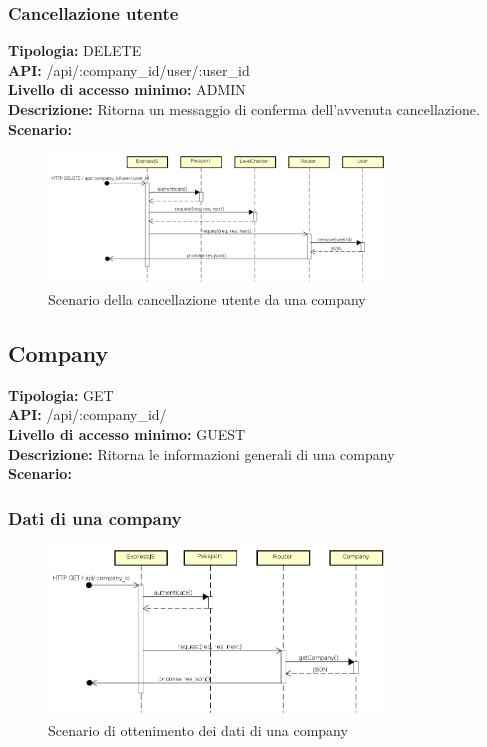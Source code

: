 \newpage
\subsubsection{Cancellazione utente}
\textbf{Tipologia:} DELETE \\
\textbf{API:} /api/:company\_id/user/:user\_id \\
\textbf{Livello di accesso minimo:} ADMIN \\
\textbf{Descrizione:} Ritorna un messaggio di conferma dell'avvenuta cancellazione. \\
\textbf{Scenario:} 
\begin{figure}[h]
\centering
\includegraphics[width=0.8\textwidth]{res/sections/backend/(DELETE)user.png}
\caption{Scenario della cancellazione utente da una company}
\end{figure}

\newpage
\subsection{Company}
\textbf{Tipologia:} GET \\
\textbf{API:} /api/:company\_id/ \\
\textbf{Livello di accesso minimo:} GUEST \\
\textbf{Descrizione:} Ritorna le informazioni generali di una company \\
\textbf{Scenario:} 
\subsubsection{Dati di una company}
\begin{figure}[h]
\centering
\includegraphics[width=0.8\textwidth]{res/sections/backend/(GET)company.png}
\caption{Scenario di ottenimento dei dati di una company}
\end{figure}

